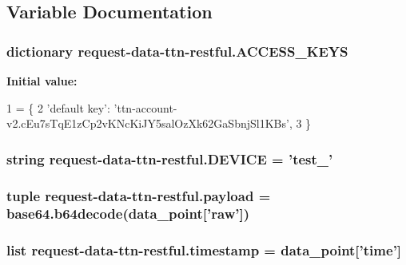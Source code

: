 \subsection{Variable Documentation}
\hypertarget{namespacerequest-data-ttn-restful_a48d677de6ac441bcb5410b1ac8bde6bc}{
\subsubsection[{A\-C\-C\-E\-S\-S\-\_\-\-K\-E\-Y\-S}]{\setlength{\rightskip}{0pt plus 5cm}dictionary request-\/{\bf data}-\/ttn-\/restful.\-A\-C\-C\-E\-S\-S\-\_\-\-K\-E\-Y\-S}}\label{namespacerequest-data-ttn-restful_a48d677de6ac441bcb5410b1ac8bde6bc}
{\bfseries Initial value\-:}
\begin{DoxyCode}
1 = \{
2     \textcolor{stringliteral}{'default key'}: \textcolor{stringliteral}{'ttn-account-v2.cEu7sTqE1zCp2vKNcKiJY5salOzXk62GaSbnjSl1KBs'},
3 \}
\end{DoxyCode}
\hypertarget{namespacerequest-data-ttn-restful_ab52fb0a29d93ecf0ce90ac2a1ce186ca}{
\subsubsection[{D\-E\-V\-I\-C\-E}]{\setlength{\rightskip}{0pt plus 5cm}string request-\/{\bf data}-\/ttn-\/restful.\-D\-E\-V\-I\-C\-E = 'test\-\_'}}\label{namespacerequest-data-ttn-restful_ab52fb0a29d93ecf0ce90ac2a1ce186ca}
\hypertarget{namespacerequest-data-ttn-restful_a2fb886d92f7defc758a7e48c36217f26}{
\subsubsection[{payload}]{\setlength{\rightskip}{0pt plus 5cm}tuple request-\/{\bf data}-\/ttn-\/restful.\-payload = base64.\-b64decode(data\-\_\-point\mbox{[}'{\bf raw}'\mbox{]})}}\label{namespacerequest-data-ttn-restful_a2fb886d92f7defc758a7e48c36217f26}
\hypertarget{namespacerequest-data-ttn-restful_a10b3d06e39c1dd442f2f80a74fc635c1}{
\subsubsection[{timestamp}]{\setlength{\rightskip}{0pt plus 5cm}list request-\/{\bf data}-\/ttn-\/restful.\-timestamp = data\-\_\-point\mbox{[}'time'\mbox{]}}}\label{namespacerequest-data-ttn-restful_a10b3d06e39c1dd442f2f80a74fc635c1}



